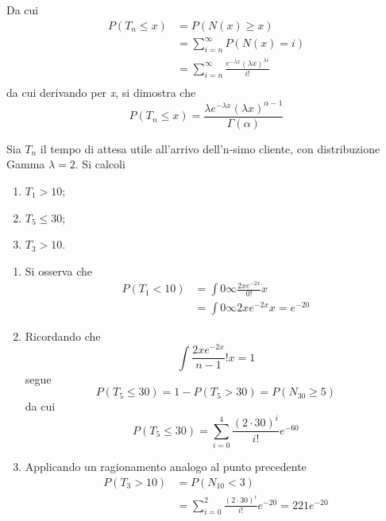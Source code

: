 \documentclass{subfiles}
\begin{document}
Da cui
\[\begin{aligned}
        P(T_{n} \le x) & = P(N(x) \ge x)                                                                   \\
                       & = \sum\limits_{i = n}^{\infty}{P(N(x) = i)}                                       \\
                       & = \sum\limits_{i = n}^{\infty}{\frac{e^{-\lambda x} (\lambda x)^{\lambda i}}{i!}} \\
    \end{aligned}\]
da cui derivando per \emph{x}, si dimostra che
\[
    P(T_{n} \le x) = \frac{\lambda e^{-\lambda x} (\lambda x)^{\alpha - 1}}{\Gamma(\alpha)}
\]
\clearpage
\begin{Example*}
    Sia \(T_{n}\) il tempo di attesa utile all'arrivo dell'n-simo cliente, con distribuzione Gamma \(\lambda = 2\).
    Si calcoli
    \begin{enumerate}
        \item \(T_{1} > 10\);
        \item \(T_{5} \le 30\);
        \item \(T_{3} > 10\).
    \end{enumerate}

    \begin{enumerate}
        \item Si osserva che
              \[\begin{aligned}
                      P(T_{1} < 10) & = \int{0}{\infty}{\frac{2x e^{-2x}}{0!}}{x} \\
                                    & = \int{0}{\infty}{2x e^{-2x}}{x} = e^{-20}
                  \end{aligned}\]

        \item Ricordando che
              \[
                  \int{\frac{2x e^{-2x}}{n - 1}!}{x} = 1
              \]
              segue
              \[
                  P(T_{5} \le 30) = 1 - P(T_{5} > 30) = P(N_{30} \ge 5)
              \]
              da cui
              \[
                  P(T_{5} \le 30) = \sum\limits_{i = 0}^{4} \frac{(2 \cdot 30)^{i}}{i!}e^{-60}
              \]

        \item Applicando un ragionamento analogo al punto precedente
              \[\begin{aligned}
                      P(T_{3} > 10) & = P(N_{10} < 3)                                                             \\
                                    & = \sum\limits_{i = 0}^{2}{\frac{(2 \cdot 30)^{i}}{i!} e^{-20}} = 221e^{-20}
                  \end{aligned}\]
    \end{enumerate}
\end{Example*}
\end{document}
